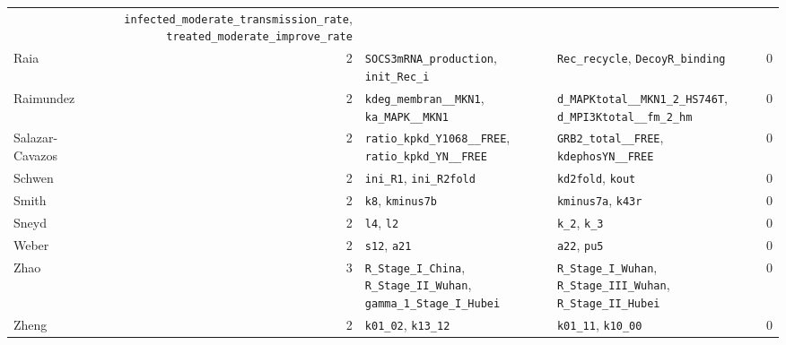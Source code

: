 {\begin{longtable}{@{}>{\raggedright\arraybackslash}p{2.3cm}r>{\raggedright\arraybackslash}p{4.0cm}>{\raggedright\arraybackslash}p{4.0cm}c@{}}
  & \texttt{infected\_\allowbreak{}moderate\_\allowbreak{}transmission\_\allowbreak{}rate}, \texttt{treated\_\allowbreak{}moderate\_\allowbreak{}improve\_\allowbreak{}rate}
  & 1 \\
Raia & 2
  & \texttt{SOCS3mRNA\_\allowbreak{}production}, \texttt{init\_\allowbreak{}Rec\_\allowbreak{}i}
  & \texttt{Rec\_\allowbreak{}recycle}, \texttt{DecoyR\_\allowbreak{}binding}
  & 0 \\
Raimundez & 2
  & \texttt{kdeg\_\allowbreak{}membran\_\allowbreak{}\_\allowbreak{}MKN1}, \texttt{ka\_\allowbreak{}MAPK\_\allowbreak{}\_\allowbreak{}MKN1}
  & \texttt{d\_\allowbreak{}MAPKtotal\_\allowbreak{}\_\allowbreak{}MKN1\_\allowbreak{}2\_\allowbreak{}HS746T}, \texttt{d\_\allowbreak{}MPI3Ktotal\_\allowbreak{}\_\allowbreak{}fm\_\allowbreak{}2\_\allowbreak{}hm}
  & 0 \\
Salazar-Cavazos & 2
  & \texttt{ratio\_\allowbreak{}kpkd\_\allowbreak{}Y1068\_\allowbreak{}\_\allowbreak{}FREE}, \texttt{ratio\_\allowbreak{}kpkd\_\allowbreak{}YN\_\allowbreak{}\_\allowbreak{}FREE}
  & \texttt{GRB2\_\allowbreak{}total\_\allowbreak{}\_\allowbreak{}FREE}, \texttt{kdephosYN\_\allowbreak{}\_\allowbreak{}FREE}
  & 0 \\
Schwen & 2
  & \texttt{ini\_\allowbreak{}R1}, \texttt{ini\_\allowbreak{}R2fold}
  & \texttt{kd2fold}, \texttt{kout}
  & 0 \\
Smith & 2
  & \texttt{k8}, \texttt{kminus7b}
  & \texttt{kminus7a}, \texttt{k43r}
  & 0 \\
Sneyd & 2
  & \texttt{l4}, \texttt{l2}
  & \texttt{k\_\allowbreak{}2}, \texttt{k\_\allowbreak{}3}
  & 0 \\
Weber & 2
  & \texttt{s12}, \texttt{a21}
  & \texttt{a22}, \texttt{pu5}
  & 0 \\
Zhao & 3
  & \texttt{R\_\allowbreak{}Stage\_\allowbreak{}I\_\allowbreak{}China}, \texttt{R\_\allowbreak{}Stage\_\allowbreak{}II\_\allowbreak{}Wuhan}, \texttt{gamma\_\allowbreak{}1\_\allowbreak{}Stage\_\allowbreak{}I\_\allowbreak{}Hubei}
  & \texttt{R\_\allowbreak{}Stage\_\allowbreak{}I\_\allowbreak{}Wuhan}, \texttt{R\_\allowbreak{}Stage\_\allowbreak{}III\_\allowbreak{}Wuhan}, \texttt{R\_\allowbreak{}Stage\_\allowbreak{}II\_\allowbreak{}Hubei}
  & 0 \\
Zheng & 2
  & \texttt{k01\_\allowbreak{}02}, \texttt{k13\_\allowbreak{}12}
  & \texttt{k01\_\allowbreak{}11}, \texttt{k10\_\allowbreak{}00}
  & 0 \\
\bottomrule
\end{longtable}}
